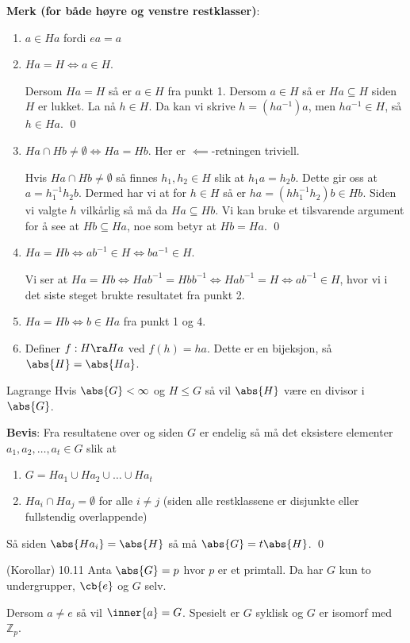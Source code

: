 \textbf{Merk (for både høyre og venstre restklasser)}:
\begin{enumerate}
  \item $a\in Ha$ fordi $ea=a$
  \item $Ha=H\iff a\in H$. 

    Dersom $Ha=H$ så er $a\in H$ fra punkt 1. Dersom $a\in H$ så er $Ha\subseteq H$ siden
    $H$ er lukket. La nå $h\in H$. Da kan vi skrive $h=(ha^{-1})a$, men $ha^{-1}\in H$, så
    $h\in Ha$. \qed
  \item $Ha\cap Hb\neq\emptyset\iff Ha=Hb$. Her er $\impliedby$-retningen triviell. 

    Hvis $Ha\cap Hb\neq\emptyset$ så finnes $h_1,h_2\in H$ slik at $h_1a=h_2b$. Dette gir oss
    at $a=h_1^{-1}h_2b$. Dermed har vi at for $h\in H$ så er $ha=(hh_1^{-1}h_2)b\in Hb$.
    Siden vi valgte $h$ vilkårlig så må da $Ha\subseteq Hb$. Vi kan bruke et tilsvarende
    argument for å see at $Hb\subseteq Ha$, noe som betyr at $Hb=Ha$. \qed
  \item $Ha=Hb\iff ab^{-1}\in H\iff ba^{-1}\in H$. 

    Vi ser at $Ha=Hb\iff Hab^{-1}=Hbb^{-1}\iff Hab^{-1}=H\iff ab^{-1}\in H$, hvor vi i det siste
    steget brukte resultatet fra punkt 2.
  \item $Ha=Hb\iff b\in Ha$ fra punkt 1 og 4.
  \item Definer $f:H\ra Ha$ ved $f(h)=ha$. Dette er en bijeksjon, så $\abs{H}=\abs{Ha}$.
\end{enumerate}

\begin{theorem*}{Lagrange}{}
Hvis $\abs{G}<\infty$ og $H\leq G$ så vil $\abs{H}$ være en divisor i $\abs{G}$.
\end{theorem*}

\textbf{Bevis}:
Fra resultatene over og siden $G$ er endelig så må det eksistere elementer 
$a_1, a_2, \dots, a_t\in G$ slik at 
\begin{enumerate}
  \item $G=Ha_1\cup Ha_2\cup \dots\cup Ha_t$
  \item $Ha_i\cap Ha_j=\emptyset$ for alle $i\neq j$ (siden alle restklassene er disjunkte eller 
    fullstendig overlappende)
\end{enumerate}
Så siden $\abs{Ha_i}=\abs{H}$ så må $\abs{G}=t\abs{H}$. \qed

\begin{theorem*}{(Korollar) 10.11}{}
  Anta $\abs{G}=p$ hvor $p$ er et primtall. Da har $G$ kun to undergrupper, $\cb{e}$ og $G$ selv.

  Dersom $a\neq e$ så vil $\inner{a}=G$. Spesielt er $G$ syklisk og $G$ er isomorf med
  $\mathbb{Z}_p$.
\end{theorem*}

